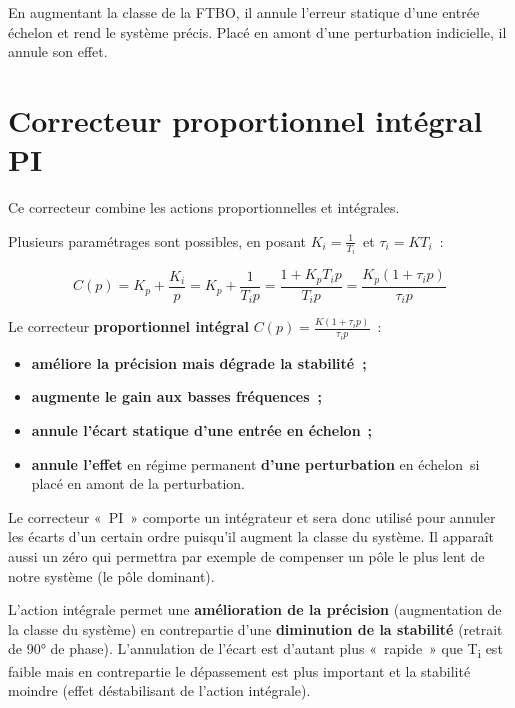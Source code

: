 En augmentant la classe de la FTBO, il annule l'erreur statique d'une entrée échelon et rend le système précis. Placé en amont d'une perturbation indicielle, il annule son effet.

\hypertarget{correcteur-proportionnel-intuxe9gral-pi}{%
\section{Correcteur proportionnel intégral PI}\label{correcteur-proportionnel-intuxe9gral-pi}}

\TLBodeCorrecteurPI[1][1]


Ce correcteur combine les actions proportionnelles et intégrales.

Plusieurs paramétrages sont possibles, en posant \(K_{i} = \frac{1}{T_{i}}\)~et \(\tau_{i} = KT_{i}\)~:

\[C(p) = K_{p} + \frac{K_{i}}{p} = K_{p} + \frac{1}{T_{i}p} = \frac{1 + K_{p}T_{i}p}{T_{i}p} = \frac{K_{p}\left( 1 + \tau_{i}p \right)}{\tau_{i}p}\]

Le correcteur \textbf{proportionnel intégral} \(C(p) = \frac{K\left( 1 + \tau_{i}p \right)}{\tau_{i}p}\)~:

\begin{itemize}
\item
  \textbf{améliore la précision mais dégrade la stabilité~;}
\item
  \textbf{augmente le gain aux basses fréquences~;}
\item
  \textbf{annule l'écart statique d'une entrée en échelon}~\textbf{;}
\item
  \textbf{annule l'effet} en régime permanent \textbf{d'une perturbation} en échelon~si placé en amont de la perturbation.
\end{itemize}

Le correcteur «~PI~» comporte un intégrateur et sera donc utilisé pour annuler les écarts d'un certain ordre puisqu'il augment la classe du système. Il apparaît aussi un zéro qui permettra par exemple de compenser un pôle le plus lent de notre système (le pôle dominant).

L'action intégrale permet une \textbf{amélioration de la précision} (augmentation de la classe du système) en contrepartie d'une \textbf{diminution de la stabilité} (retrait de 90° de phase). L'annulation de l'écart est d'autant plus «~rapide~» que T\textsubscript{i} est faible mais en contrepartie le dépassement est plus important et la stabilité moindre (effet déstabilisant de l'action intégrale).

